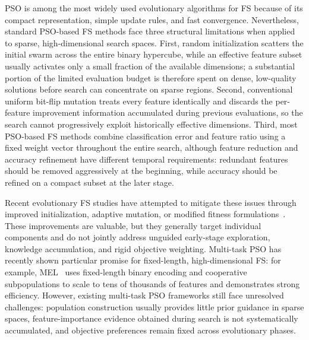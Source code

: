 PSO is among the most widely used evolutionary algorithms for FS because of its compact representation, simple update rules, and fast convergence. Nevertheless, standard PSO-based FS methods face three structural limitations when applied to sparse, high-dimensional search spaces. First, random initialization scatters the initial swarm across the entire binary hypercube, while an effective feature subset usually activates only a small fraction of the available dimensions; a substantial portion of the limited evaluation budget is therefore spent on dense, low-quality solutions before search can concentrate on sparse regions. Second, conventional uniform bit-flip mutation treats every feature identically and discards the per-feature improvement information accumulated during previous evaluations, so the search cannot progressively exploit historically effective dimensions. Third, most PSO-based FS methods combine classification error and feature ratio using a fixed weight vector throughout the entire search, although feature reduction and accuracy refinement have different temporal requirements: redundant features should be removed aggressively at the beginning, while accuracy should be refined on a compact subset at the later stage.

Recent evolutionary FS studies have attempted to mitigate these issues through improved initialization, adaptive mutation, or modified fitness formulations~\cite{wangjia2022,wang2022,xuezhang2024,wei2025}. These improvements are valuable, but they generally target individual components and do not jointly address unguided early-stage exploration, knowledge accumulation, and rigid objective weighting. Multi-task PSO has recently shown particular promise for fixed-length, high-dimensional FS: for example, MEL~\cite{mel2024} uses fixed-length binary encoding and cooperative subpopulations to scale to tens of thousands of features and demonstrates strong efficiency. However, existing multi-task PSO frameworks still face unresolved challenges: population construction usually provides little prior guidance in sparse spaces, feature-importance evidence obtained during search is not systematically accumulated, and objective preferences remain fixed across evolutionary phases.


